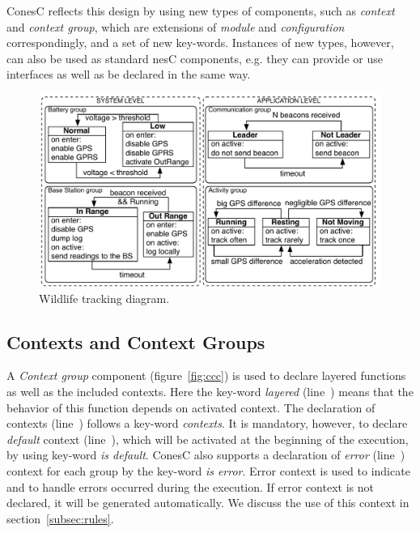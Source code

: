 ConesC reflects this design by using new types of components, such as
\emph{context} and \emph{context group}, which are extensions of \emph{module} and
\emph{configuration} correspondingly, and a set of new key-words.
Instances of new types, however, can also be used as standard nesC components,
e.g. they can provide or use interfaces as well as be declared in the same way.

\begin{figure}[!h]
\centering
\includegraphics[width=\columnwidth]{pdf/wildlifetracking}
\caption{Wildlife tracking diagram.}
\label{fig:wtd}
\end{figure}

\subsection{Contexts and Context Groups}\label{subsec:components}

A \emph{Context group} component (figure~\ref{fig:ccc}) is used to declare layered
functions as well as the included contexts. Here the key-word \emph{layered}
(line~) means that the behavior of this function depends on
activated context. The declaration of contexts (line~) follows a key-word
\emph{contexts}. It is mandatory, however, to declare \emph{default} context
(line~), which will be activated at the beginning of the execution,
by using key-word \emph{is default}. ConesC also supports a declaration of \emph{error}
(line~) context for each group by the key-word \emph{is error}.
Error context is used to indicate and to handle errors occurred during the execution. If
error context is not declared, it will be generated automatically. We discuss the use of
this context in section~\ref{subsec:rules}.


